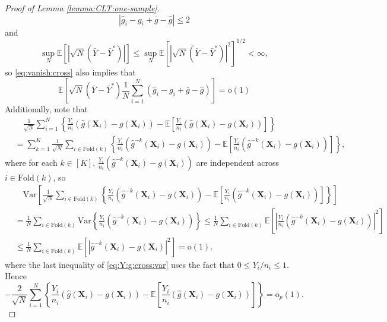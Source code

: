 \documentclass[12pt,letterpaper]{article}
\begin{document}
\begin{proof}[Proof of Lemma \ref{lemma:CLT:one-sample}]
$$|\hat{g}_i-g_i+\bar{g}-\hat{g}|\leq2$$ 
and 
$$\sup_{N}\mathbb{E}[|\sqrt{N}(\bar{Y}-\bar{Y}^*)|]\leq\sup_{N}\mathbb{E}[|\sqrt{N}(\bar{Y}-\bar{Y}^*)|^2]^{1/2}<\infty,$$ 
so \eqref{eq:vanish:cross} also implies that 
\begin{equation}\label{eq:expectation:vanish:cross}
    \mathbb{E}\left[\sqrt{N}(\bar{Y}-\bar{Y}^*)\frac{1}{N}\sum_{i=1}^N(\hat{g}_i-g_i+\bar{g}-\hat{g})\right]=\mathrm{o}(1)
\end{equation}
Additionally, note that 
\begin{equation}\label{eq:Y:g:cross:centered}
\begin{array}{rl}
&\displaystyle\quad\frac{1}{\sqrt{N}}\sum_{i=1}^N\left\{\frac{Y_i}{n_i}(\hat{g}(\mathbf{X}_i)-g(\mathbf{X}_i))-\mathbb{E}\left[\frac{Y_i}{n_i}(\hat{g}(\mathbf{X}_i)-g(\mathbf{X}_i))\right]\right\}\\
&\displaystyle=\sum_{k=1}^K\frac{1}{\sqrt{N}}\sum_{i\in\textrm{Fold}(k)}\left\{\frac{Y_i}{n_i}(\hat{g}^{-k}(\mathbf{X}_i)-g(\mathbf{X}_i))-\mathbb{E}\left[\frac{Y_i}{n_i}(\hat{g}^{-k}(\mathbf{X}_i)-g(\mathbf{X}_i))\right]\right\},
\end{array}
\end{equation}
where for each $k\in[K]$, $\displaystyle\frac{Y_i}{n_i}(\hat{g}^{-k}(\mathbf{X}_i)-g(\mathbf{X}_i))$ are independent across $i\in\textrm{Fold}(k)$, so 
\begin{equation}\label{eq:Y:g:cross:var}
\begin{array}{rl}
&\displaystyle\quad\mathrm{Var}\left[\frac{1}{\sqrt{N}}\sum_{i\in\textrm{Fold}(k)}\left\{\frac{Y_i}{n_i}(\hat{g}^{-k}(\mathbf{X}_i)-g(\mathbf{X}_i))-\mathbb{E}\left[\frac{Y_i}{n_i}(\hat{g}^{-k}(\mathbf{X}_i)-g(\mathbf{X}_i))\right]\right\}\right]\\
&\displaystyle=\frac{1}{N}\sum_{i\in\textrm{Fold}(k)}\mathrm{Var}\left\{\frac{Y_i}{n_i}(\hat{g}^{-k}(\mathbf{X}_i)-g(\mathbf{X}_i))\right\}\leq\frac{1}{N}\sum_{i\in\textrm{Fold}(k)}\mathbb{E}\left[\left|\frac{Y_i}{n_i}(\hat{g}^{-k}(\mathbf{X}_i)-g(\mathbf{X}_i))\right|^2\right]\\
&\displaystyle\leq\frac{1}{N}\sum_{i\in\textrm{Fold}(k)}\mathbb{E}\left[\left|\hat{g}^{-k}(\mathbf{X}_i)-g(\mathbf{X}_i)\right|^2\right]=\mathrm{o}(1).
\end{array}
\end{equation}
where the last inequality of \eqref{eq:Y:g:cross:var} uses the fact that $0\leq Y_i/n_i\leq 1$. Hence 
\begin{equation}\label{eq:Y:g:vanish:2}
    -\frac{2}{\sqrt{N}}\sum_{i=1}^N\left\{\frac{Y_i}{n_i}(\hat{g}(\mathbf{X}_i)-g(\mathbf{X}_i))-\mathbb{E}\left[\frac{Y_i}{n_i}(\hat{g}(\mathbf{X}_i)-g(\mathbf{X}_i))\right]\right\}=\mathrm{o}_p(1).

\end{equation}
\end{proof}
\end{document}
